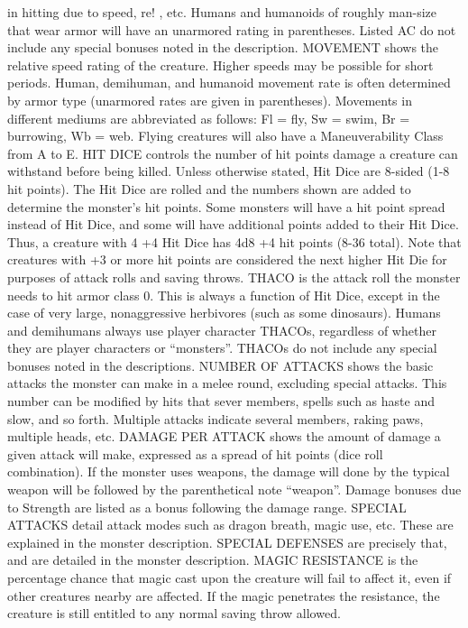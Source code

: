 \documentclass[../tsr2102.tex]{subfiles}
\begin{document}
in hitting due to speed, re! , etc. Humans and humanoids of roughly
man-size that wear armor will have an unarmored rating in parentheses.
Listed AC do not include any special bonuses noted in the description.
MOVEMENT shows the relative speed rating of the creature. Higher
speeds may be possible for short periods. Human, demihuman, and humanoid movement rate is often determined by armor type (unarmored
rates are given in parentheses). Movements in different mediums are abbreviated as follows: Fl = fly, Sw = swim, Br = burrowing, Wb = web.
Flying creatures will also have a Maneuverability Class from A to E.
HIT DICE controls the number of hit points damage a creature can withstand before being killed. Unless otherwise stated, Hit Dice are 8-sided
(1-8 hit points). The Hit Dice are rolled and the numbers shown are added
to determine the monster's hit points. Some monsters will have a hit point
spread instead of Hit Dice, and some will have additional points added to
their Hit Dice. Thus, a creature with 4 +4 Hit Dice has 4d8 +4 hit points
(8-36 total). Note that creatures with +3 or more hit points are considered
the next higher Hit Die for purposes of attack rolls and saving throws.
THACO is the attack roll the monster needs to hit armor class 0. This is always a function of Hit Dice, except in the case of very large, nonaggressive herbivores (such as some dinosaurs). Humans and
demihumans always use player character THACOs, regardless of whether
they are player characters or “monsters”. THACOs do not include any
special bonuses noted in the descriptions.
NUMBER OF ATTACKS shows the basic attacks the monster can make in
a melee round, excluding special attacks. This number can be modified by
hits that sever members, spells such as haste and slow, and so forth. Multiple attacks indicate several members, raking paws, multiple heads, etc.
DAMAGE PER ATTACK shows the amount of damage a given attack will
make, expressed as a spread of hit points (dice roll combination). If the
monster uses weapons, the damage will done by the typical weapon will
be followed by the parenthetical note “weapon”. Damage bonuses due to
Strength are listed as a bonus following the damage range.
SPECIAL ATTACKS detail attack modes such as dragon breath, magic
use, etc. These are explained in the monster description.
SPECIAL DEFENSES are precisely that, and are detailed in the monster
description.
MAGIC RESISTANCE is the percentage chance that magic cast upon the
creature will fail to affect it, even if other creatures nearby are affected. If
the magic penetrates the resistance, the creature is still entitled to any normal saving throw allowed.
\end{document}
